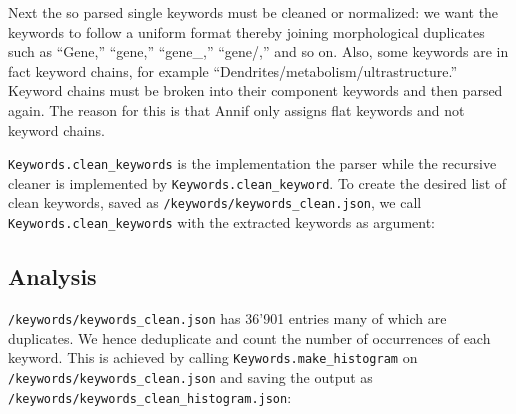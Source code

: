 Next the so parsed single keywords must be cleaned or normalized: we
want the keywords to follow a uniform format thereby joining
morphological duplicates such as ``Gene,'' ``gene,'' ``gene\_,''
``gene/,'' and so on. Also, some keywords are in fact keyword chains,
for example ``Dendrites/metabolism/ultrastructure.'' Keyword chains must
be broken into their component keywords and then parsed again. The
reason for this is that Annif only assigns flat keywords and not keyword
chains.

\texttt{Keywords.clean\_keywords} is the implementation the parser while
the recursive cleaner is implemented by
\texttt{Keywords.clean\_keyword}. To create the desired list of clean
keywords, saved as \texttt{/keywords/keywords\_clean.json}, we call
\texttt{Keywords.clean\_keywords} with the extracted keywords as
argument:

\begin{Shaded}
\begin{Highlighting}[]
\OperatorTok{=}\NormalTok{)}
\OperatorTok{=}
\NormalTok{)}
\end{Highlighting}
\end{Shaded}

\hypertarget{analysis-1}{%
\subsection{Analysis}\label{analysis-1}}

\texttt{/keywords/keywords\_clean.json} has 36'901 entries many of which
are duplicates. We hence deduplicate and count the number of occurrences
of each keyword. This is achieved by calling
\texttt{Keywords.make\_histogram} on
\texttt{/keywords/keywords\_clean.json} and saving the output as
\texttt{/keywords/keywords\_clean\_histogram.json}:

\begin{Shaded}
\begin{Highlighting}[]
\OperatorTok{=}\NormalTok{)}
\OperatorTok{=}
\NormalTok{)}
\end{Highlighting}
\end{Shaded}

